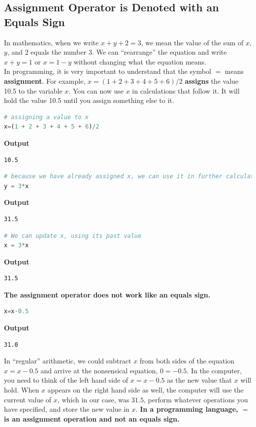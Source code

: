 \subsection{Assignment Operator is Denoted with an Equals Sign}

In mathematics, when we write $x+y+2=3$, we mean the value of the sum of $x$, $y$, and $2$ equals the number $3$. We can ``rearrange'' the equation and write $x + y = 1$ or $x = 1 - y$ without changing what the equation means. \\

In programming, it is very important to understand that the symbol $=$ means \textbf{assignment}. For example, $x=(1 + 2 + 3 + 4 + 5 + 6)/2$ \textbf{assigns} the value 10.5 to the variable $x$. You can now use $x$ in calculations that follow it. It will hold the value 10.5 until you assign something else to it.

\begin{lstlisting}[language=Julia,style=mystyle]
# assigning a value to x
x=(1 + 2 + 3 + 4 + 5 + 6)/2
\end{lstlisting}
\textbf{Output} 
\begin{verbatim}
10.5
\end{verbatim}

\begin{lstlisting}[language=Julia,style=mystyle]
# because we have already assigned x, we can use it in further calculations
y = 3*x
\end{lstlisting}
\textbf{Output} 
\begin{verbatim}
31.5
\end{verbatim}


\begin{lstlisting}[language=Julia,style=mystyle]
# We can update x, using its past value
x = 3*x
\end{lstlisting}
\textbf{Output} 
\begin{verbatim}
31.5
\end{verbatim}

\textbf{The assignment operator does not work like an equals sign.}
\begin{lstlisting}[language=Julia,style=mystyle]
x=x-0.5
\end{lstlisting}
\textbf{Output} 
\begin{verbatim}
31.0
\end{verbatim}
In ``regular'' arithmetic, we could subtract $x$ from both sides of the equation $x=x-0.5$ and arrive at the nonsensical equation, $0=-0.5$. In the computer, you need to think of the left hand side of $x=x-0.5$ as the new value that $x$ will hold. When $x$ appears on the right hand side as well, the computer will use the current value of $x$, which in our case, was $31.5$, perform whatever operations you have specified, and store the new value in $x$. \textbf{In a programming language, $=$ is an assignment operation and not an equals sign.}\\

